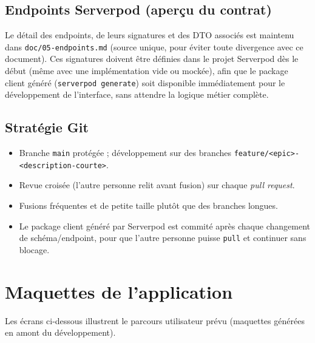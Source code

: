 \documentclass[a4paper,11pt]{article}
\begin{document}
\subsection{Endpoints Serverpod (aperçu du contrat)}

Le détail des endpoints, de leurs signatures et des DTO associés est maintenu dans
\texttt{doc/05-endpoints.md} (source unique, pour éviter toute divergence avec ce
document). Ces signatures doivent être définies dans le projet Serverpod dès le
début (même avec une implémentation vide ou mockée), afin que le package client
généré (\texttt{serverpod generate}) soit disponible immédiatement pour le
développement de l'interface, sans attendre la logique métier complète.

\subsection{Stratégie Git}
\begin{itemize}[leftmargin=1.5em]
  \item Branche \texttt{main} protégée ; développement sur des branches
        \texttt{feature/<epic>-<description-courte>}.
  \item Revue croisée (l'autre personne relit avant fusion) sur chaque
        \textit{pull request}.
  \item Fusions fréquentes et de petite taille plutôt que des branches longues.
  \item Le package client généré par Serverpod est commité après chaque changement
        de schéma/endpoint, pour que l'autre personne puisse \texttt{pull} et
        continuer sans blocage.
\end{itemize}

\section{Maquettes de l'application}

Les écrans ci-dessous illustrent le parcours utilisateur prévu (maquettes générées en
amont du développement).
\end{document}
